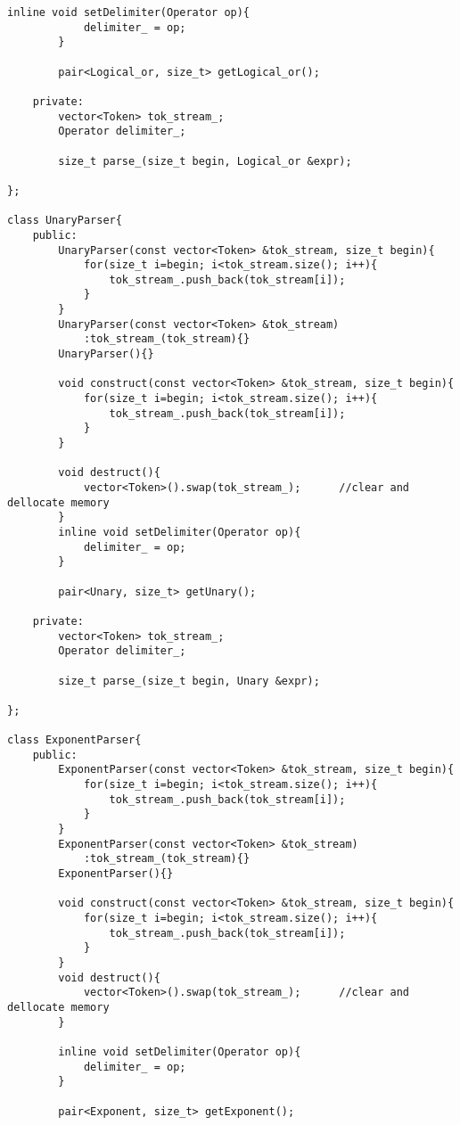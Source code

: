 \documentclass[pdftex,12pt,letterpaper,notitlepage,twoside]{article}
\begin{document}
\begin{lstlisting}[frame=single,caption={C program for testing}]
        inline void setDelimiter(Operator op){
            delimiter_ = op;
        }

        pair<Logical_or, size_t> getLogical_or();

    private:
        vector<Token> tok_stream_;
        Operator delimiter_;

        size_t parse_(size_t begin, Logical_or &expr);

};

class UnaryParser{
    public:
        UnaryParser(const vector<Token> &tok_stream, size_t begin){
            for(size_t i=begin; i<tok_stream.size(); i++){
                tok_stream_.push_back(tok_stream[i]);
            }
        }
        UnaryParser(const vector<Token> &tok_stream)
            :tok_stream_(tok_stream){}
        UnaryParser(){}

        void construct(const vector<Token> &tok_stream, size_t begin){
            for(size_t i=begin; i<tok_stream.size(); i++){
                tok_stream_.push_back(tok_stream[i]);
            }
        }

        void destruct(){
            vector<Token>().swap(tok_stream_);      //clear and dellocate memory
        }
        inline void setDelimiter(Operator op){
            delimiter_ = op;
        }

        pair<Unary, size_t> getUnary();

    private:
        vector<Token> tok_stream_;
        Operator delimiter_;

        size_t parse_(size_t begin, Unary &expr);

};

class ExponentParser{
    public:
        ExponentParser(const vector<Token> &tok_stream, size_t begin){
            for(size_t i=begin; i<tok_stream.size(); i++){
                tok_stream_.push_back(tok_stream[i]);
            }
        }
        ExponentParser(const vector<Token> &tok_stream)
            :tok_stream_(tok_stream){}
        ExponentParser(){}

        void construct(const vector<Token> &tok_stream, size_t begin){
            for(size_t i=begin; i<tok_stream.size(); i++){
                tok_stream_.push_back(tok_stream[i]);
            }
        }
        void destruct(){
            vector<Token>().swap(tok_stream_);      //clear and dellocate memory
        }

        inline void setDelimiter(Operator op){
            delimiter_ = op;
        }

        pair<Exponent, size_t> getExponent();


\end{lstlisting}
\end{document}
